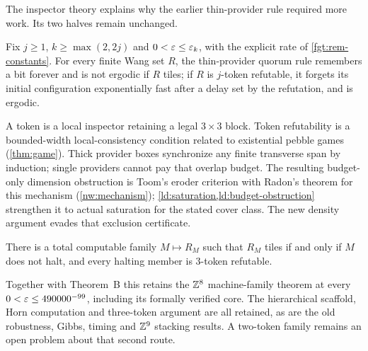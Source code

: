 The inspector theory explains why the earlier thin-provider rule required more work. Its two halves remain unchanged.
\begin{mainB}
Fix $j\ge1$, $k\ge\max(2,2j)$ and $0<\varepsilon\le\varepsilon_k$, with the explicit rate of \cref{fgt:rem-constants}. For every finite Wang set $R$, the thin-provider quorum rule remembers a bit forever and is not ergodic if $R$ tiles; if $R$ is $j$-token refutable, it forgets its initial configuration exponentially fast after a delay set by the refutation, and is ergodic.
\end{mainB}
A token is a local inspector retaining a legal $3\times3$ block. Token refutability is a bounded-width local-consistency condition related to existential pebble games (\cref{thm:game}). Thick provider boxes synchronize any finite transverse span by induction; single providers cannot pay that overlap budget. The resulting budget-only dimension obstruction is Toom's eroder criterion with Radon's theorem for this mechanism (\cref{nw:mechanism}); \cref{ld:saturation,ld:budget-obstruction} strengthen it to actual saturation for the stated cover class. The new density argument evades that exclusion certificate.

\begin{mainC}
There is a total computable family $M\mapsto R_M$ such that $R_M$ tiles if and only if $M$ does not halt, and every halting member is $3$-token refutable.
\end{mainC}
Together with Theorem~B this retains the $\mathbb{Z}^8$ machine-family theorem at every $0<\varepsilon\le490000^{-99}$, including its formally verified core. The hierarchical scaffold, Horn computation and three-token argument are all retained, as are the old robustness, Gibbs, timing and $\mathbb{Z}^9$ stacking results. A two-token family remains an open problem about that second route.

